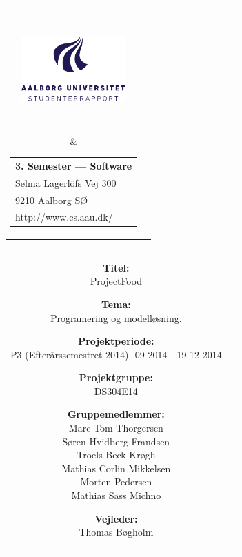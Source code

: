 \thispagestyle{empty}
\enlargethispage*{\ifcounts 4\else 2\fi\baselineskip}
{\samepage
\begin{tabular}{cc}
  \parbox{0.5\textwidth}{ %
    \hspace*{1cm} %
    \includegraphics[width=4cm,height=4cm,keepaspectratio]{images/aau_logo_da.pdf}} &
  \parbox{0.5\textwidth}{\begin{tabular}{l}
      {\small \textbf{3. Semester --- Software}}\\
      {\small Selma Lagerlöfs Vej 300} \\
      {\small 9210 Aalborg SØ} \\
      {\small http://www.cs.aau.dk/}
    \end{tabular}}
\end{tabular}

\begin{tabular}{cc}
  \parbox{8cm}{
  \begin{description}
    \item { \textbf{Titel:}}\\ 
      ProjectFood
    \item { \textbf{Tema:}}\\ 
      Programering og modelløsning. 
  \end{description}
  
  \parbox{8cm}{
  \begin{description}
    \item { \textbf{Projektperiode:}}\\
      P3 (Efterårssemestret 2014) -09-2014 - 19-12-2014
    \hspace{4cm}
    \item { \textbf{Projektgruppe:}}\\
        DS304E14
    \hspace{4cm}
    \item {\textbf{Gruppemedlemmer:}}\\
      Marc Tom Thorgersen\\
      Søren Hvidberg Frandsen\\
      Troels Beck Krøgh\\
      Mathias Corlin Mikkelsen\\
      Morten Pedersen\\
      Mathias Sass Michno\\
    \hspace{2cm}
    \item { \textbf{Vejleder:}}\\
      Thomas Bøgholm\\
    \end{description}
  }

}
\end{tabular}}
